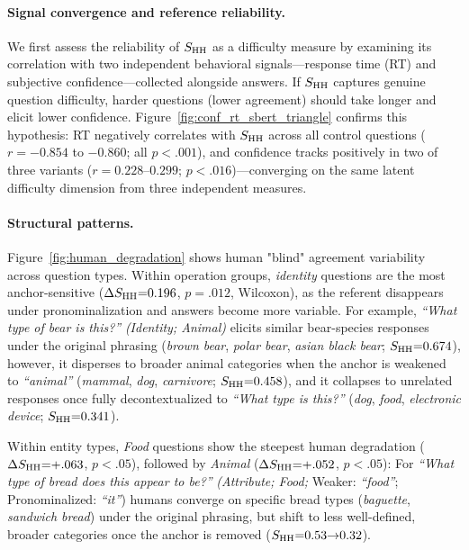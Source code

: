 \documentclass[letterpaper]{article}
\begin{document}
\paragraph{Signal convergence and reference reliability.}
We first assess the reliability of $\sHH$ as a difficulty measure by examining its correlation with two independent behavioral signals---response time (RT) and subjective confidence---collected alongside answers.
If $\sHH$ captures genuine question difficulty, harder questions (lower agreement) should take longer and elicit lower confidence.
Figure~\ref{fig:conf_rt_sbert_triangle} confirms this hypothesis: RT negatively correlates with $\sHH$ across all control questions ($r{=}{-}0.854$ to $-0.860$; all $p{<}.001$), and confidence tracks positively in two of three variants ($r{=}0.228$--$0.299$; $p{<}.016$)---converging on the same latent difficulty dimension from three independent measures.

\paragraph{Structural patterns.}
\label{sec:human_patterns_st}
Figure~\ref{fig:human_degradation} shows human "blind" agreement variability across question types.
Within operation groups, \textit{identity} questions are the most anchor-sensitive ($\Delta\sHH{=}0.196$, $p{=}.012$, Wilcoxon), as the referent disappears under pronominalization and answers become more variable. %
For example, \textit{``What type of bear is this?''} \emph{(Identity; Animal)} elicits similar bear-species responses under the original phrasing (\textit{brown bear}, \textit{polar bear}, \textit{asian black bear}; $\sHH{=}0.674$), however, it disperses to broader animal categories when the anchor is weakened to  \textit{``animal''} (\textit{mammal}, \textit{dog}, \textit{carnivore}; $\sHH{=}0.458$), and it collapses to unrelated responses once fully decontextualized to \textit{``What type is this?''} (\textit{dog}, \textit{food}, \textit{electronic device}; $\sHH{=}0.341$).

Within entity types, \textit{Food} questions show the steepest human degradation ($\Delta\sHH{=}{+}.063$, $p{<}.05$), followed by \textit{Animal} ($\Delta\sHH{=}{+}.052$, $p{<}.05$): For
\textit{``What type of bread does this appear to be?''} \emph{(Attribute; Food;} Weaker: \textit{``food''};
Pronominalized: \textit{``it''}) humans converge on specific bread types
(\textit{baguette}, \textit{sandwich bread}) under the original phrasing, but shift
to less well-defined, broader categories once the anchor is removed ($\sHH{=}0.53{\to}0.32$).
\end{document}
